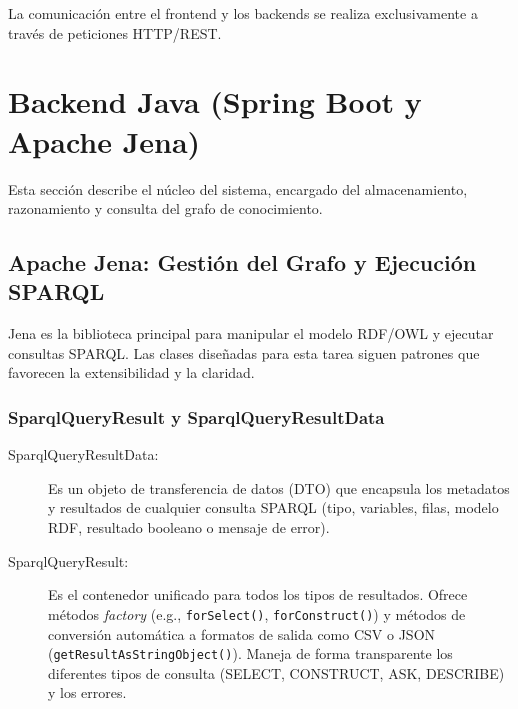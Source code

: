 \documentclass{article}
\begin{document}
La comunicación entre el frontend y los backends se realiza exclusivamente a través de peticiones HTTP/REST.

\section{Backend Java (Spring Boot y Apache Jena)}
Esta sección describe el núcleo del sistema, encargado del almacenamiento, razonamiento y consulta del grafo de conocimiento.

\subsection{Apache Jena: Gestión del Grafo y Ejecución SPARQL}
Jena es la biblioteca principal para manipular el modelo RDF/OWL y ejecutar consultas SPARQL. Las clases diseñadas para esta tarea siguen patrones que favorecen la extensibilidad y la claridad.

\subsubsection{SparqlQueryResult y SparqlQueryResultData}
\begin{description}
    \item[SparqlQueryResultData:] Es un objeto de transferencia de datos (DTO) que encapsula los metadatos y resultados de cualquier consulta SPARQL (tipo, variables, filas, modelo RDF, resultado booleano o mensaje de error).
    \item[SparqlQueryResult:] Es el contenedor unificado para todos los tipos de resultados. Ofrece métodos \textit{factory} (e.g., \texttt{forSelect()}, \texttt{forConstruct()}) y métodos de conversión automática a formatos de salida como CSV o JSON (\texttt{getResultAsStringObject()}). Maneja de forma transparente los diferentes tipos de consulta (SELECT, CONSTRUCT, ASK, DESCRIBE) y los errores.
\end{description}
\end{document}
